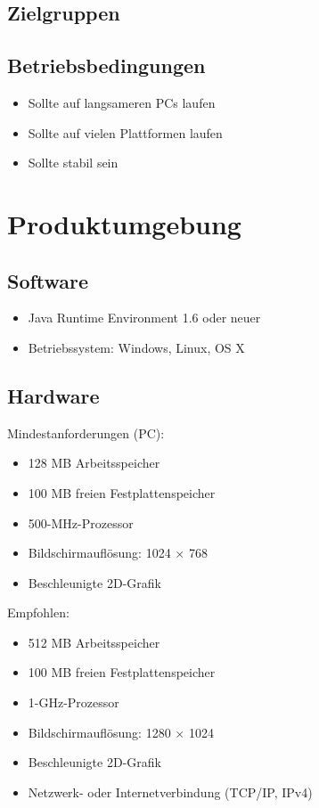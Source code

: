 \documentclass[a4paper,10pt]{article}
\begin{document}
\subsection{Zielgruppen}


\subsection{Betriebsbedingungen}
\begin{itemize}
\item Sollte auf langsameren PCs laufen
\item Sollte auf vielen Plattformen laufen
\item Sollte stabil sein
\end{itemize}
\section{Produktumgebung}
\subsection{Software}
\begin{itemize}
\item Java Runtime Environment 1.6 oder neuer
\item Betriebssystem: Windows, Linux, OS X
\end{itemize}
\subsection{Hardware}
Mindestanforderungen (PC): 
\begin{itemize}
\item 128 MB Arbeitsspeicher
\item 100 MB freien Festplattenspeicher
\item 500-MHz-Prozessor
\item Bildschirmauflösung: 1024 $\times$ 768
\item Beschleunigte 2D-Grafik
\end{itemize}
Empfohlen:
\begin{itemize}
\item 512 MB Arbeitsspeicher
\item 100 MB freien Festplattenspeicher
\item 1-GHz-Prozessor
\item Bildschirmauflösung: 1280 $\times$ 1024
\item Beschleunigte 2D-Grafik
\item Netzwerk- oder Internetverbindung (TCP/IP, IPv4)
\end{itemize}
\end{document}
